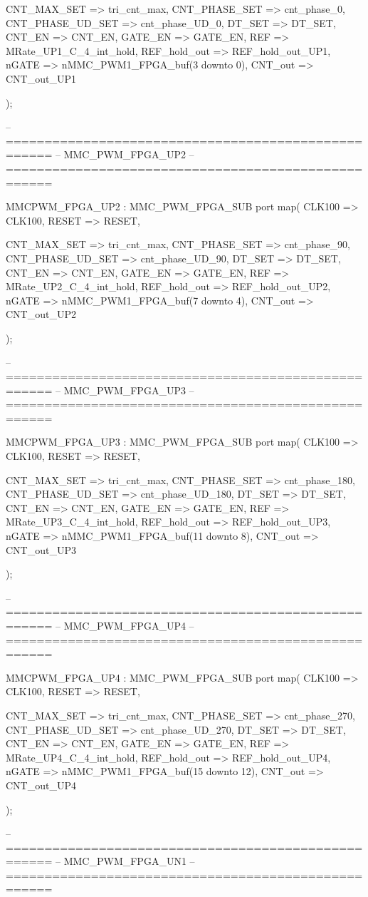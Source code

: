 \begin{mylisting}[language=VHDL,caption=ゲート信号出力モジュール,label=MMC_PWM_GEN_module_VHDL]
		CNT_MAX_SET			=> tri_cnt_max,
		CNT_PHASE_SET		=> cnt_phase_0,
		CNT_PHASE_UD_SET	=> cnt_phase_UD_0,
		DT_SET				=> DT_SET,
		CNT_EN				=> CNT_EN,
		GATE_EN				=> GATE_EN,
		REF					=> MRate_UP1_C_4_int_hold,
		REF_hold_out		=> REF_hold_out_UP1,
		nGATE					=> nMMC_PWM1_FPGA_buf(3 downto 0),
		CNT_out				=> CNT_out_UP1
		
			);
			
-- ====================================================
-- MMC_PWM_FPGA_UP2
-- ====================================================

	MMCPWM_FPGA_UP2 : MMC_PWM_FPGA_SUB
		port map(
		CLK100				=> CLK100,
		RESET					=> RESET,
		
		CNT_MAX_SET			=> tri_cnt_max,
		CNT_PHASE_SET		=> cnt_phase_90,
		CNT_PHASE_UD_SET	=> cnt_phase_UD_90,
		DT_SET				=> DT_SET,
		CNT_EN				=> CNT_EN,
		GATE_EN				=> GATE_EN,
		REF					=> MRate_UP2_C_4_int_hold,
		REF_hold_out		=> REF_hold_out_UP2,
		nGATE					=> nMMC_PWM1_FPGA_buf(7 downto 4),
		CNT_out				=> CNT_out_UP2

			);


-- ====================================================
-- MMC_PWM_FPGA_UP3
-- ====================================================

	MMCPWM_FPGA_UP3 : MMC_PWM_FPGA_SUB
		port map(
		CLK100				=> CLK100,
		RESET					=> RESET,
		
		CNT_MAX_SET			=> tri_cnt_max,
		CNT_PHASE_SET		=> cnt_phase_180,
		CNT_PHASE_UD_SET	=> cnt_phase_UD_180,
		DT_SET				=> DT_SET,
		CNT_EN				=> CNT_EN,
		GATE_EN				=> GATE_EN,
		REF					=> MRate_UP3_C_4_int_hold,
		REF_hold_out		=> REF_hold_out_UP3,
		nGATE					=> nMMC_PWM1_FPGA_buf(11 downto 8),
		CNT_out				=> CNT_out_UP3

			);

-- ====================================================
-- MMC_PWM_FPGA_UP4
-- ====================================================

	MMCPWM_FPGA_UP4 : MMC_PWM_FPGA_SUB
		port map(
		CLK100				=> CLK100,
		RESET					=> RESET,
		
		CNT_MAX_SET			=> tri_cnt_max,
		CNT_PHASE_SET		=> cnt_phase_270,
		CNT_PHASE_UD_SET	=> cnt_phase_UD_270,
		DT_SET				=> DT_SET,
		CNT_EN				=> CNT_EN,
		GATE_EN				=> GATE_EN,
		REF					=> MRate_UP4_C_4_int_hold,
		REF_hold_out		=> REF_hold_out_UP4,
		nGATE					=> nMMC_PWM1_FPGA_buf(15 downto 12),
		CNT_out				=> CNT_out_UP4

			);

-- ====================================================
-- MMC_PWM_FPGA_UN1
-- ====================================================


\end{mylisting}
